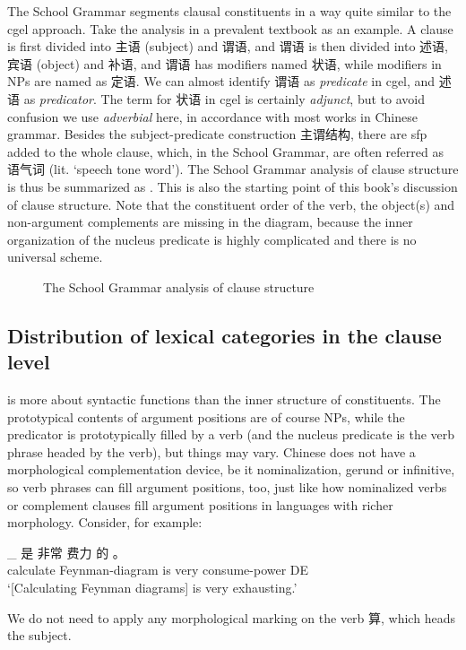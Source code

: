 \documentclass[../main.tex]{subfiles}
\begin{document}
The School Grammar segments clausal constituents in a way quite similar to the \ac{cgel} approach. 
Take the analysis in a prevalent textbook \citet[]{xianhan2004} as an example.
A clause is first divided into 主语 (subject) and 谓语, and 谓语 is then divided into 述语, 宾语 (object) and 补语,
and 谓语 has modifiers named 状语, while modifiers in NPs are named as 定语. We can almost identify 
谓语 as \emph{predicate} in \ac{cgel}, and 述语 as \emph{predicator}. 
The term for 状语 in \ac{cgel} is certainly \emph{adjunct}, but to avoid confusion we use \emph{adverbial}
here, in accordance with most works in Chinese grammar. 
Besides the subject-predicate construction 主谓结构, 
there are \ac{sfp} added to the whole clause, 
which, in the School Grammar, are often referred as 语气词 (lit. `speech tone word').
The School Grammar analysis of clause structure is thus 
be summarized as .
This is also the starting point of this book's discussion of clause structure. 
Note that the constituent order of the verb, 
the object(s) and non-argument complements are missing in the diagram, because 
the inner organization of the nucleus predicate is highly complicated and there is no universal scheme.

\begin{figure}
    \centering
    
    \caption{The School Grammar analysis of clause structure}
    \label{fig:school-grammar-clause}
\end{figure}

\subsection{Distribution of lexical categories in the clause level}

 is more about syntactic functions than the inner structure of constituents.
The prototypical contents of argument positions are of course NPs, 
while the predicator is prototypically filled by a verb 
(and the nucleus predicate is the verb phrase headed by the verb), 
but things may vary.
Chinese does not have a morphological complementation device,
be it nominalization, gerund or infinitive, 
so verb phrases can fill argument positions, too, 
just like how nominalized verbs or complement clauses fill argument positions 
in languages with richer morphology. %
Consider, for example:
\begin{exe}
    \ex \gll [ 算 费曼-图 ]_{} 是 非常 费力 的 。\\
    {} calculate Feynman-diagram {} is very consume-power DE \\ %
    \glt `[Calculating Feynman diagrams] is very exhausting.'
\end{exe}
We do not need to apply any morphological marking on the verb 算, which heads the subject.
\end{document}
